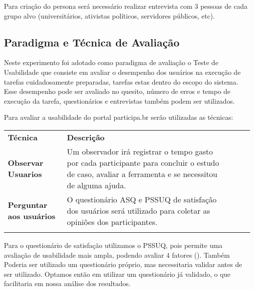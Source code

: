 Para criação do persona será necessário realizar entrevista com 3 pessoas de cada grupo alvo (universitários, ativistas políticos, servidores públicos, etc).

\subsection{Paradigma e Técnica de Avaliação}

Neste experimento foi adotado como paradigma de avaliação o Teste de Usabilidade que consiste em avaliar o desempenho dos usuários na execução de tarefas cuidadosamente preparadas, tarefas estas dentro do escopo do sistema. Esse desempenho pode ser avaliado no quesito, número de erros e tempo de execução da tarefa, questionários e entrevistas também podem ser utilizados.

Para avaliar a usabilidade do portal participa.br serão utilizadas as técnicas:


\begin{table}[h]
\begin{tabular}{lllll}
\cline{1-2}
\multicolumn{1}{|l|}{\textbf{Técnica}}                & \multicolumn{1}{l|}{\textbf{Descrição}}                                                                                                                                    &  &  &  \\ \cline{1-2}
\multicolumn{1}{|l|}{\textbf{Observar Usuarios}}      & \multicolumn{1}{l|}{Um observador irá registrar o tempo gasto por cada participante para concluir o estudo de caso, avaliar a ferramenta e se necessitou de alguma ajuda.} &  &  &  \\ \cline{1-2}
\multicolumn{1}{|l|}{\textbf{Perguntar aos usuários}} & \multicolumn{1}{l|}{O questionário ASQ e PSSUQ de satisfação dos usuários será utilizado para coletar as opiniões dos participantes.}                                      &  &  &  \\ \cline{1-2}
                                                      &                                                                                                                                                                            &  &  & 
\end{tabular}
\end{table}


Para o questionário de satisfação utilizamos o PSSUQ, pois permite uma avaliação de usabilidade mais ampla, podendo avaliar 4 fatores (). Também Poderia ser utilizado um questionário próprio, mas necessitaria validar antes de ser utilizado. Optamos então em utilizar um questionário já validado, o que facilitaria em nossa análise dos resultados.

